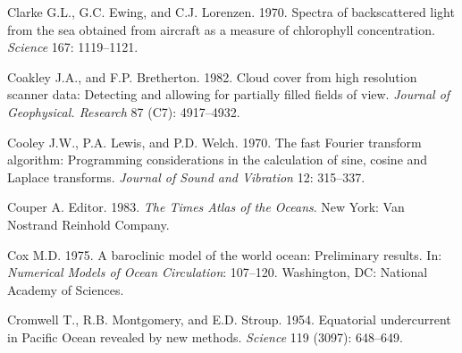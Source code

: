 \begin{thebibliography}{999}
Clarke G.L., G.C. Ewing, and C.J. Lorenzen.  1970. Spectra of
backscattered light from the sea obtained from aircraft as a measure
of chlorophyll concentration. \textit{Science} 167: 1119--1121.
%

Coakley J.A., and F.P. Bretherton.  1982. Cloud cover from high
resolution scanner data: Detecting and allowing for partially filled
fields of view. \textit{Journal of Geophysical. Research} 87 (C7):
4917--4932.
%

Cooley J.W., P.A. Lewis, and P.D. Welch.  1970. The fast Fourier
transform algorithm: Programming considerations in the calculation of
sine, cosine and Laplace transforms. \textit{Journal of Sound and
  Vibration} 12: 315--337.
%

Couper A. Editor.  1983. \textit{The Times Atlas of the Oceans}. New
York: Van Nostrand Reinhold Company.
%

Cox M.D.  1975. A baroclinic model of the world ocean: Preliminary
results. In: \textit{Numerical Models of Ocean Circulation}:
107--120. Washington, DC: National Academy of Sciences.
%

Cromwell T., R.B. Montgomery, and E.D. Stroup.  1954. Equatorial
undercurrent in Pacific Ocean revealed by new
methods. \textit{Science} 119 (3097): 648--649.
%


\end{thebibliography}
